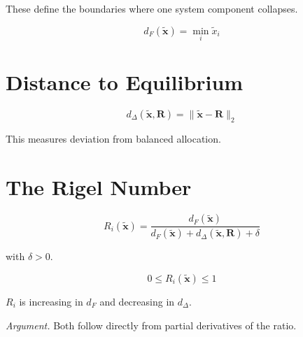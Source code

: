 \documentclass[letterpaper, 10 pt, conference]{ieeeconf}
\begin{document}
These define the boundaries where one system component collapses.

\begin{definition}
\begin{equation}
d_F(\tilde{\mathbf{x}}) = \min_i \tilde{x}_i
\end{equation}
\end{definition}

\section{Distance to Equilibrium}

\begin{definition}
\begin{equation}
d_\Delta(\tilde{\mathbf{x}}, \mathbf{R}) = \|\tilde{\mathbf{x}} - \mathbf{R}\|_2
\end{equation}
\end{definition}

This measures deviation from balanced allocation.

\section{The Rigel Number}

\begin{definition}
\begin{equation}
R_i(\tilde{\mathbf{x}}) = \frac{d_F(\tilde{\mathbf{x}})}{d_F(\tilde{\mathbf{x}}) + d_\Delta(\tilde{\mathbf{x}}, \mathbf{R}) + \delta}
\end{equation}
\end{definition}

with $\delta > 0$.

\begin{proposition}[Bounds]
\begin{equation}
0 \le R_i(\tilde{\mathbf{x}}) \le 1
\end{equation}
\end{proposition}

\begin{proposition}[Monotonicity]
$R_i$ is increasing in $d_F$ and decreasing in $d_\Delta$.
\end{proposition}

\textit{Argument.}
Both follow directly from partial derivatives of the ratio.
\end{document}
